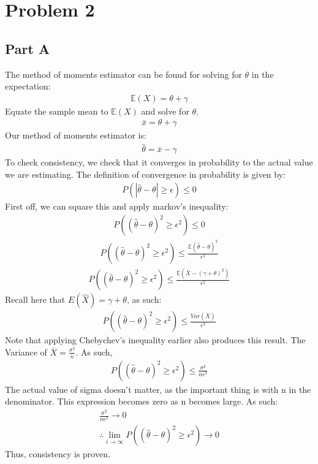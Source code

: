 \documentclass{article}
\begin{document}
\section*{Problem 2}

\subsection*{Part A}
The method of moments estimator can be found for solving for $\theta$ in the expectation:
\begin{align*}
\mathbb{E}(X) = \theta + \gamma
\end{align*}
Equate the sample mean to $\mathbb{E}(X)$ and solve for $\theta$.
\begin{align*}
\bar{x} = \theta + \gamma
\end{align*}
Our method of moments estimator is:
\begin{align*}
\hat{\theta} = \bar{x} - \gamma
\end{align*}
To check consistency, we check that it converges in probability to the actual value we are estimating. The definition of convergence in probability is given by:
\begin{align*}
P(| \hat{\theta} - \theta| \geq \epsilon) \leq 0
\end{align*}
First off, we can square this and apply markov's inequality:
\begin{align*}
P(( \hat{\theta} - \theta)^2 \geq \epsilon^2) \leq 0
\end{align*}
\begin{align*}
P(( \hat{\theta} - \theta)^2 \geq \epsilon^2) \leq \frac{\mathbb{E}(\hat{\theta} - \theta)^2}{\epsilon^2}
\end{align*}
\begin{align*}
P(( \hat{\theta} - \theta)^2 \geq \epsilon^2) \leq \frac{\mathbb{E}(\bar{X}-(\gamma+ \theta)^2)}{\epsilon^2}
\end{align*}
Recall here that $E(\hat{X})=\gamma+ \theta$, as such:
\begin{align*}
P(( \hat{\theta} - \theta)^2 \geq \epsilon^2) \leq \frac{Var(\bar{X})}{\epsilon^2}
\end{align*}
Note that applying Chebychev's inequality earlier also produces this result. The Variance of $\bar{X}=\frac{\sigma^2}{n}$. As such, 
\begin{align*}
P(( \hat{\theta} - \theta)^2 \geq \epsilon^2) \leq \frac{\sigma^2}{n \epsilon^2}
\end{align*}
The actual value of sigma doesn't matter, as the important thing is with n in the denominator. This expression becomes zero as n becomes large. As such:
\begin{align*}
\frac{\sigma^2}{n \epsilon^2} \rightarrow 0 \\
\therefore \lim_{i \rightarrow \infty} P(( \hat{\theta} - \theta)^2 \geq \epsilon^2) \rightarrow 0
\end{align*}
Thus, consistency is proven.
\end{document}
